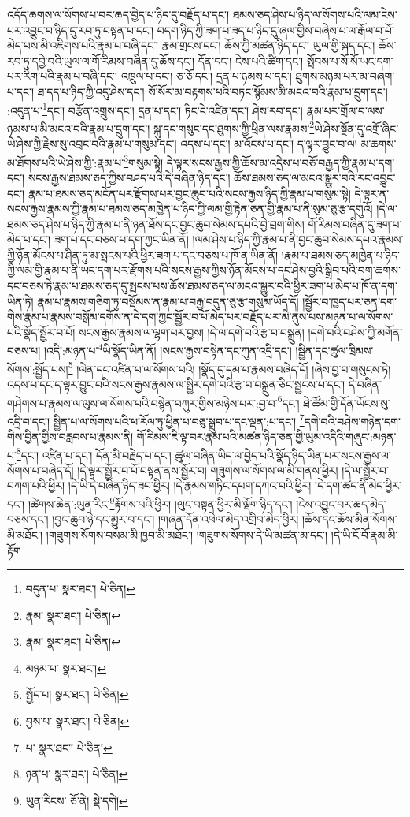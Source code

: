 འདོད་ཆགས་ལ་སོགས་པ་བར་ཆད་བྱེད་པ་ཉིད་དུ་བརྗོད་པ་དང་། ཐམས་ཅད་ཤེས་པ་ཉིད་ལ་སོགས་པའི་ལམ་ངེས་པར་འབྱུང་བ་ཉིད་དུ་རབ་ཏུ་བསྟན་པ་དང་། བདག་ཉིད་ཀྱི་ཟག་པ་ཟད་པ་ཉིད་དུ་ཞལ་གྱིས་བཞེས་པ་ལ་རྒོལ་བ་པོ་མེད་པས་མི་འཇིགས་པའི་རྣམ་པ་བཞི་དང་། རྣམ་གྲངས་དང་། ཆོས་ཀྱི་མཚན་ཉིད་དང་། ཡུལ་གྱི་སྐད་དང་། ཆོས་རབ་ཏུ་དབྱེ་བའི་ཡུལ་ལ་གོ་རིམས་བཞིན་དུ་ཆོས་དང་། དོན་དང་། ངེས་པའི་ཚིག་དང་། སྤོབས་པ་སོ་སོ་ཡང་དག་པར་རིག་པའི་རྣམ་པ་བཞི་དང་། འཁྲུལ་པ་དང་། ཅ་ཅོ་དང་། དྲན་པ་ཉམས་པ་དང་། ཐུགས་མཉམ་པར་མ་བཞག་པ་དང་། ཐ་དད་པ་ཉིད་ཀྱི་འདུ་ཤེས་དང་། སོ་སོར་མ་བརྟགས་པའི་བཏང་སྙོམས་མི་མངའ་བའི་རྣམ་པ་དྲུག་དང་། :འདུན་པ་\footnote{བདུན་པ་  སྣར་ཐང་།  པེ་ཅིན། }དང་། བརྩོན་འགྲུས་དང་། དྲན་པ་དང་། ཏིང་ངེ་འཛིན་དང་། ཤེས་རབ་དང་། རྣམ་པར་གྲོལ་བ་ལས་ཉམས་པ་མི་མངའ་བའི་རྣམ་པ་དྲུག་དང་། སྐུ་དང་གསུང་དང་ཐུགས་ཀྱི་ཕྲིན་ལས་རྣམས་\footnote{རྣམ་  སྣར་ཐང་།  པེ་ཅིན། }ཡེ་ཤེས་སྔོན་དུ་འགྲོ་ཞིང་ཡེ་ཤེས་ཀྱི་རྗེས་སུ་འབྲང་བའི་རྣམ་པ་གསུམ་དང་། འདས་པ་དང་། མ་འོངས་པ་དང་། ད་ལྟར་བྱུང་བ་ལ། མ་ཆགས་མ་ཐོགས་པའི་ཡེ་ཤེས་ཀྱི་:རྣམ་པ་\footnote{རྣམ་  སྣར་ཐང་།  པེ་ཅིན། }གསུམ་སྟེ། དེ་ལྟར་སངས་རྒྱས་ཀྱི་ཆོས་མ་འདྲེས་པ་བཅོ་བརྒྱད་ཀྱི་རྣམ་པ་དག་དང་། སངས་རྒྱས་ཐམས་ཅད་ཀྱིས་བཤད་པའི་དེ་བཞིན་ཉིད་དང་། ཆོས་ཐམས་ཅད་ལ་མངའ་སྒྱུར་བའི་རང་འབྱུང་དང་། རྣམ་པ་ཐམས་ཅད་མངོན་པར་རྫོགས་པར་བྱང་ཆུབ་པའི་སངས་རྒྱས་ཉིད་ཀྱི་རྣམ་པ་གསུམ་སྟེ། དེ་ལྟར་ན་སངས་རྒྱས་རྣམས་ཀྱི་རྣམ་པ་ཐམས་ཅད་མཁྱེན་པ་ཉིད་ཀྱི་ལམ་གྱི་རྟེན་ཅན་གྱི་རྣམ་པ་ནི་སུམ་ཅུ་རྩ་དགུའོ། །དེ་ལ་ཐམས་ཅད་ཤེས་པ་ཉིད་ཀྱི་རྣམ་པ་ནི་ཉན་ཐོས་དང་བྱང་ཆུབ་སེམས་དཔའི་བྱེ་བྲག་གིས། གོ་རིམས་བཞིན་དུ་ཟག་པ་མེད་པ་དང་། ཟག་པ་དང་བཅས་པ་དག་ཀྱང་ཡིན་ནོ། །ལམ་ཤེས་པ་ཉིད་ཀྱི་རྣམ་པ་ནི་བྱང་ཆུབ་སེམས་དཔའ་རྣམས་ཀྱི་ཉོན་མོངས་པ་ཤིན་ཏུ་མ་སྤངས་པའི་ཕྱིར་ཟག་པ་དང་བཅས་པ་ཁོ་ན་ཡིན་ནོ། །རྣམ་པ་ཐམས་ཅད་མཁྱེན་པ་ཉིད་ཀྱི་ལམ་གྱི་རྣམ་པ་ནི་ཡང་དག་པར་རྫོགས་པའི་སངས་རྒྱས་ཀྱིས་ཉོན་མོངས་པ་དང་ཤེས་བྱའི་སྒྲིབ་པའི་བག་ཆགས་དང་བཅས་ཏེ་རྣམ་པ་ཐམས་ཅད་དུ་སྤངས་པས་ཆོས་ཐམས་ཅད་ལ་མངའ་སྒྱུར་བའི་ཕྱིར་ཟག་པ་མེད་པ་ཁོ་ན་དག་ཡིན་ཏེ། རྣམ་པ་རྣམས་གཅིག་ཏུ་བསྡོམས་ན་རྣམ་པ་བརྒྱ་བདུན་ཅུ་རྩ་གསུམ་ཡོད་དོ། །སྦྱོར་བ་ཁྱད་པར་ཅན་དག་གིས་རྣམ་པ་རྣམས་བསྒོམ་དགོས་ན་དེ་དག་ཀྱང་སྦྱོར་བ་པོ་མེད་པར་བརྗོད་པར་མི་ནུས་པས་མཉན་པ་ལ་སོགས་པའི་སྣོད་སྦྱོར་བ་པོ། སངས་རྒྱས་རྣམས་ལ་ལྷག་པར་བྱས། །དེ་ལ་དགེ་བའི་རྩ་བ་བསྐྲུན། །དགེ་བའི་བཤེས་ཀྱི་མགོན་བཅས་པ། །འདི་:མཉན་པ་\footnote{མཉམ་པ་  སྣར་ཐང་། }ཡི་སྣོད་ཡིན་ནོ། །སངས་རྒྱས་བསྟེན་དང་ཀུན་འདྲི་དང་། །སྦྱིན་དང་ཚུལ་ཁྲིམས་སོགས་:སྤྱོད་པས།\footnote{སྤྱོད་པ།  སྣར་ཐང་།  པེ་ཅིན། } །ལེན་དང་འཛིན་པ་ལ་སོགས་པའི། །སྣོད་དུ་དམ་པ་རྣམས་བཞེད་དོ། །ཞེས་བྱ་བ་གསུངས་ཏེ། འདས་པ་དང་ད་ལྟར་བྱུང་བའི་སངས་རྒྱས་རྣམས་ལ་སྤྱིར་དགེ་བའི་རྩ་བ་བསྐྲུན་ཅིང་སྦྱངས་པ་དང་། དེ་བཞིན་གཤེགས་པ་རྣམས་ལ་ལུས་ལ་སོགས་པའི་བསྙེན་བཀུར་གྱིས་མཉེས་པར་:བྱ་བ་\footnote{བྱས་པ་  སྣར་ཐང་།  པེ་ཅིན། }དང་། ཐེ་ཚོམ་གྱི་དོན་ཡོངས་སུ་འདྲི་བ་དང་། སྦྱིན་པ་ལ་སོགས་པའི་ཕ་རོལ་ཏུ་ཕྱིན་པ་བཅུ་སྒྲུབ་པ་དང་ལྡན་:པ་དང་། \footnote{པ་  སྣར་ཐང་།  པེ་ཅིན། }དགེ་བའི་བཤེས་གཉེན་དག་གིས་བྱིན་གྱིས་བརླབས་པ་རྣམས་ནི། གོ་རིམས་ཇི་ལྟ་བར་རྣམ་པའི་མཚན་ཉིད་ཅན་གྱི་ཡུམ་འདིའི་གཞུང་:མཉན་པ་\footnote{ཉན་པ་  སྣར་ཐང་།  པེ་ཅིན། }དང་། འཛིན་པ་དང་། དོན་མི་བརྗེད་པ་དང་། ཚུལ་བཞིན་ཡིད་ལ་བྱེད་པའི་སྣོད་ཉིད་ཡིན་པར་སངས་རྒྱས་ལ་སོགས་པ་བཞེད་དོ། །དེ་ལྟར་སྦྱོར་བ་པོ་བསྟན་ནས་སྦྱོར་བ། གཟུགས་ལ་སོགས་ལ་མི་གནས་ཕྱིར། །དེ་ལ་སྦྱོར་བ་བཀག་པའི་ཕྱིར། །དེ་ཡི་དེ་བཞིན་ཉིད་ཟབ་ཕྱིར། །དེ་རྣམས་གཏིང་དཔག་དཀའ་བའི་ཕྱིར། །དེ་དག་ཚད་ནི་མེད་ཕྱིར་དང་། །ཚེགས་ཆེན་:ཡུན་རིང་\footnote{ཡུན་རིངས་  ཅོ་ནེ།  སྡེ་དགེ། }རྟོགས་པའི་ཕྱིར། །ལུང་བསྟན་ཕྱིར་མི་ལྡོག་ཉིད་དང་། །ངེས་འབྱུང་བར་ཆད་མེད་བཅས་དང་། །བྱང་ཆུབ་ཉེ་དང་མྱུར་བ་དང་། །གཞན་དོན་འཕེལ་མེད་འགྲིབ་མེད་ཕྱིར། །ཆོས་དང་ཆོས་མིན་སོགས་མི་མཐོང་། །གཟུགས་སོགས་བསམ་མི་ཁྱབ་མི་མཐོང་། །གཟུགས་སོགས་དེ་ཡི་མཚན་མ་དང་། །དེ་ཡི་ངོ་བོ་རྣམ་མི་རྟོག 